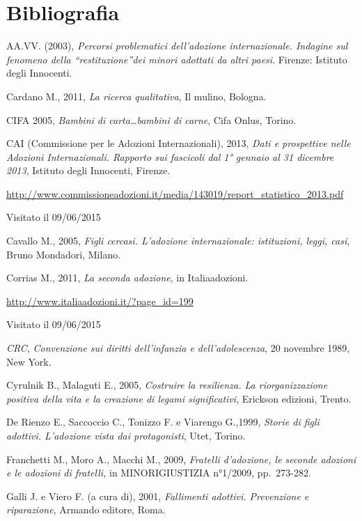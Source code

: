 \documentclass[12pt,oneside,svgnames]{memoir}
\begin{document}
\chapter*{Bibliografia}\label{bibliografia}

\setlength{\parindent}{0pt} \setlength{\parskip}{6pt plus 2pt minus 1pt}

AA.VV. (2003), \emph{Percorsi problematici dell'adozione internazionale.
Indagine sul fenomeno della ``restituzione''dei minori adottati da altri
paesi}. Firenze: Istituto degli Innocenti.

Cardano M., 2011, \emph{La ricerca qualitativa}, Il mulino, Bologna.

CIFA 2005, \emph{Bambini di carta\ldots{}bambini di carne}, Cifa Onlus,
Torino.

CAI (Commissione per le Adozioni Internazionali), 2013, \emph{Dati e
prospettive nelle Adozioni Internazionali. Rapporto sui fascicoli dal 1°
gennaio al 31 dicembre 2013}, Istituto degli Innocenti, Firenze.

\url{http://www.commissioneadozioni.it/media/143019/report_statistico_2013.pdf}

Visitato il 09/06/2015

Cavallo M., 2005, \emph{Figli cercasi. L'adozione internazionale:
istituzioni, leggi, casi}, Bruno Mondadori, Milano.

Corrias M., 2011, \emph{La seconda adozione}, in Italiaadozioni.

\url{http://www.italiaadozioni.it/?page_id=199}

Visitato il 09/06/2015

\emph{CRC}, \emph{Convenzione sui diritti dell'infanzia e
dell'adolescenza}, 20 novembre 1989, New York.

Cyrulnik B., Malaguti E., 2005, \emph{Costruire la resilienza. La
riorganizzazione positiva della vita e la creazione di legami
significativi}, Erickson edizioni, Trento.

De Rienzo E., Saccoccio C., Tonizzo F. e Viarengo G.,1999, \emph{Storie
di figli adottivi. L'adozione vista dai protagonisti}, Utet, Torino.

Franchetti M., Moro A., Macchi M., 2009, \emph{Fratelli d'adozione, le
seconde adozioni e le adozioni di fratelli, }in MINORIGIUSTIZIA
n°1/2009, pp.~273-282.

Galli J. e Viero F. (a cura di), 2001, \emph{Fallimenti adottivi.
Prevenzione e riparazione}, Armando editore, Roma.
\end{document}
